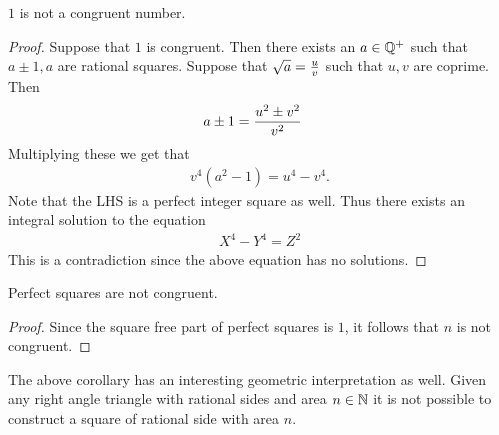 \begin{theorem}[Fermat]
  $1$ is not a congruent number.
\end{theorem}
\begin{proof}
  Suppose that $1$ is congruent. Then there exists an $a\in \mathbb{Q}^+$ such that $a\pm 1, a$ are rational squares. Suppose that $\sqrt{a} = \frac{u}{v}$ such that $u,v$ are coprime. Then
  \begin{align*}
    a\pm 1 & = \frac{u^2 \pm v^2}{v^2}
  \end{align*}
  Multiplying these we get that
  \begin{align*}
    v^4(a^2-1) = u^4 - v^4.
  \end{align*}
  Note that the LHS is a perfect integer square as well. Thus there exists an integral solution to the equation
  \begin{align*}
    X^4 - Y^4 = Z^2
  \end{align*}
  This is a contradiction since the above equation has no solutions.
\end{proof}

\begin{corollary}
  Perfect squares are not congruent.
\end{corollary}
\begin{proof}
  Since the square free part of perfect squares is $1$, it follows that $n$ is not congruent. 
\end{proof}
\begin{remark}
  The above corollary has an interesting geometric interpretation as well. Given any right angle triangle with rational sides and area $n\in \mathbb{N}$ it is not possible to construct a square of rational side with area $n$.
\end{remark}
